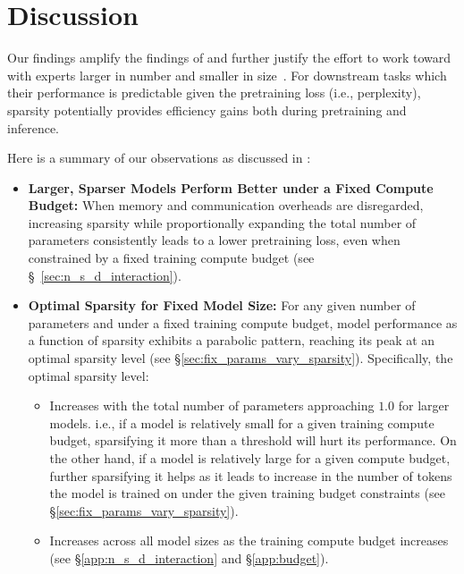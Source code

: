\section{Discussion}
\label{sec:discussion}
Our findings amplify the findings of \citet{ludziejewski2024scaling} and further justify the effort to work toward \moes with experts larger in number and smaller in size~\citep{he2024mixture}. For downstream tasks which their performance is predictable given the pretraining loss (i.e., perplexity), sparsity potentially provides efficiency gains both during pretraining and inference. 

Here is a summary of our observations as discussed in  :
\begin{itemize}[leftmargin=*]
    \item \textbf{Larger, Sparser Models Perform Better under a Fixed Compute Budget:} When memory and communication overheads are disregarded, increasing sparsity while proportionally expanding the total number of parameters consistently leads to a lower pretraining loss, even when constrained by a fixed training compute budget (see \S~\ref{sec:n_s_d_interaction}).

        \item \textbf{Optimal Sparsity for Fixed Model Size:} 
    For any given number of parameters and under a fixed training compute budget, model performance as a function of sparsity exhibits a parabolic pattern, reaching its peak at an optimal sparsity level (see \S\ref{sec:fix_params_vary_sparsity}). Specifically, the optimal sparsity level:
    \begin{itemize}
        \item Increases with the total number of parameters approaching $1.0$ for larger models. i.e., if a model is relatively small for a given training compute budget, sparsifying it more than a threshold will hurt its performance. On the other hand, if a model is relatively large for a given compute budget, further sparsifying it helps as it leads to increase in the number of tokens the model is trained on under the given training budget constraints (see \S\ref{sec:fix_params_vary_sparsity}). 
        \item Increases across all model sizes as the training compute budget increases (see \S\ref{app:n_s_d_interaction} and \S\ref{app:budget}). 
    \end{itemize}
    

\end{itemize}
